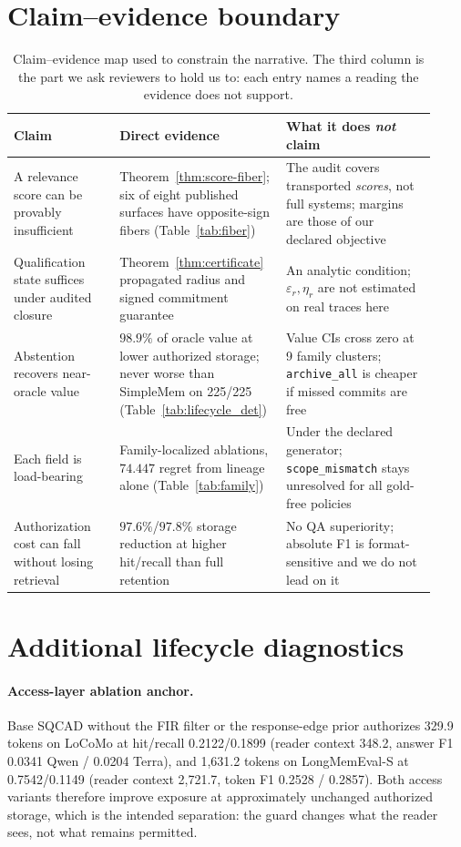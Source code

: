 \documentclass{article}
\newcommand{\SQCAD}{\textsc{SQCAD}}
\begin{document}
\section{Claim--evidence boundary}
\label{app:claims}
\begin{table}[!ht]
\caption{Claim--evidence map used to constrain the narrative. The third column is
the part we ask reviewers to hold us to: each entry names a reading the evidence
does not support.}
\label{tab:claim}
\centering\small
\begin{tabular}{p{0.24\linewidth}p{0.34\linewidth}p{0.34\linewidth}}
\toprule
Claim & Direct evidence & What it does \emph{not} claim \\
\midrule
A relevance score can be provably insufficient
& Theorem~\ref{thm:score-fiber}; six of eight published surfaces have opposite-sign fibers (Table~\ref{tab:fiber})
& The audit covers transported \emph{scores}, not full systems; margins are those of our declared objective \\
Qualification state suffices under audited closure
& Theorem~\ref{thm:certificate} propagated radius and signed commitment guarantee
& An analytic condition; $\varepsilon_r,\eta_r$ are not estimated on real traces here \\
Abstention recovers near-oracle value
& $98.9\%$ of oracle value at lower authorized storage; never worse than SimpleMem on 225/225 (Table~\ref{tab:lifecycle_det})
& Value CIs cross zero at 9 family clusters; \texttt{archive\_all} is cheaper if missed commits are free \\
Each field is load-bearing
& Family-localized ablations, $74.447$ regret from lineage alone (Table~\ref{tab:family})
& Under the declared generator; \texttt{scope\_mismatch} stays unresolved for all gold-free policies \\
Authorization cost can fall without losing retrieval
& $97.6\%$/$97.8\%$ storage reduction at higher hit/recall than full retention
& No QA superiority; absolute F1 is format-sensitive and we do not lead on it \\
\bottomrule
\end{tabular}
\end{table}

\section{Additional lifecycle diagnostics}
\label{app:diagnostics}
\paragraph{Access-layer ablation anchor.} Base \SQCAD{} without the FIR filter or
the response-edge prior authorizes 329.9 tokens on LoCoMo at hit/recall
0.2122/0.1899 (reader context 348.2, answer F1 0.0341 Qwen / 0.0204 Terra), and
1{,}631.2 tokens on LongMemEval-S at 0.7542/0.1149 (reader context 2{,}721.7,
token F1 0.2528 / 0.2857). Both access variants therefore improve exposure at
approximately unchanged authorized storage, which is the intended separation:
the guard changes what the reader sees, not what remains permitted.
\end{document}
